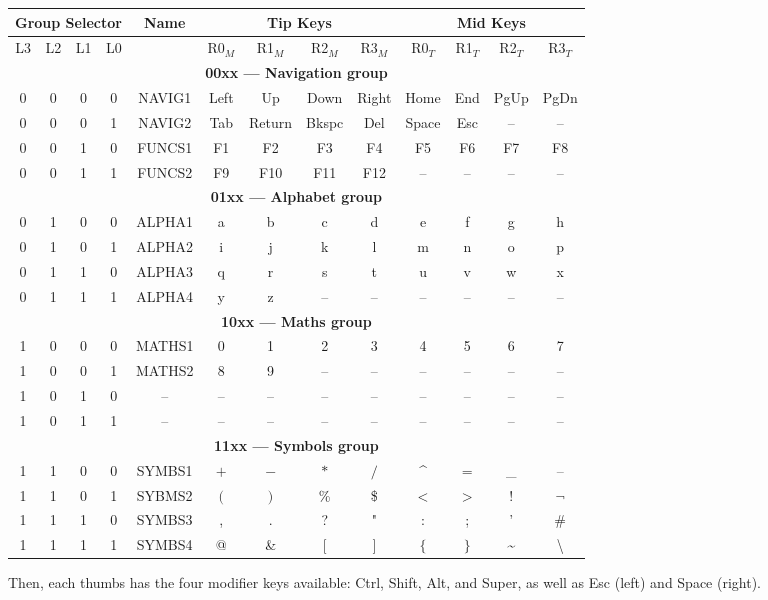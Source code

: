 \documentclass{article}
\begin{document}
\begin{center}
	\begin{tabular}{|cccc|c|cccc|cccc|}
		\hline
		\multicolumn{4}{|c|}{\textbf{Group Selector}} & \textbf{Name} & \multicolumn{4}{|c|}{\textbf{Tip Keys}} & \multicolumn{4}{|c|}{\textbf{Mid Keys}} \\ \hline
		L3 & L2 & L1 & L0 &  & R0$_M$ & R1$_M$ & R2$_M$ & R3$_M$ & R0$_T$ & R1$_T$ & R2$_T$ & R3$_T$ \\ \hline
		\multicolumn{13}{|c|}{\textbf{00xx --- Navigation group}}\\ \hline
		0 & 0 & 0 & 0 & NAVIG1 & Left & Up & Down & Right & Home & End & PgUp & PgDn \\ \hline
		0 & 0 & 0 & 1 & NAVIG2 & Tab & Return & Bkspc & Del & Space & Esc & -- & -- \\ \hline
		0 & 0 & 1 & 0 & FUNCS1 & F1 & F2 & F3 & F4 & F5 & F6 & F7 & F8 \\ \hline
		0 & 0 & 1 & 1 & FUNCS2 & F9 & F10 & F11 & F12 & -- & -- & -- & -- \\ \hline
		\multicolumn{13}{|c|}{\textbf{01xx --- Alphabet group}}\\ \hline
		0 & 1 & 0 & 0 & ALPHA1 & a & b & c & d & e & f & g & h \\ \hline
		0 & 1 & 0 & 1 & ALPHA2 & i & j & k & l & m & n & o & p \\ \hline
		0 & 1 & 1 & 0 & ALPHA3 & q & r & s & t & u & v & w & x \\ \hline
		0 & 1 & 1 & 1 & ALPHA4 & y & z & -- & -- & -- & -- & -- & -- \\ \hline
		\multicolumn{13}{|c|}{\textbf{10xx --- Maths group}}\\ \hline
		1 & 0 & 0 & 0 & MATHS1 & 0 & 1 & 2 & 3 & 4 & 5 & 6 & 7 \\ \hline
		1 & 0 & 0 & 1 & MATHS2 & 8 & 9 & -- & -- & -- & -- & -- & -- \\ \hline
		1 & 0 & 1 & 0 & --     & -- & -- & -- & -- & -- & -- & -- & -- \\ \hline
		1 & 0 & 1 & 1 & --     & -- & -- & -- & -- & -- & -- & -- & -- \\ \hline
		\multicolumn{13}{|c|}{\textbf{11xx --- Symbols group}}\\ \hline
		1 & 1 & 0 & 0 & SYMBS1 & $+$ & $-$ & $*$ & $/$ & \textasciicircum & $=$ & \_ & -- \\ \hline
		1 & 1 & 0 & 1 & SYBMS2 & $($ & $)$ & \% & \$ & $<$ & $>$ & ! & $\neg$ \\ \hline
		1 & 1 & 1 & 0 & SYMBS3 & , & . & ? & " & : & ; & ' & \# \\ \hline
		1 & 1 & 1 & 1 & SYMBS4 & @ & \& & $[$ & $]$ & $\{$ & $\}$ & \textasciitilde & \textbackslash \\ \hline
		
	\end{tabular}
\end{center}

Then, each thumbs has the four modifier keys available: Ctrl, Shift, Alt, and Super, as well as Esc (left) and Space (right).
\end{document}
